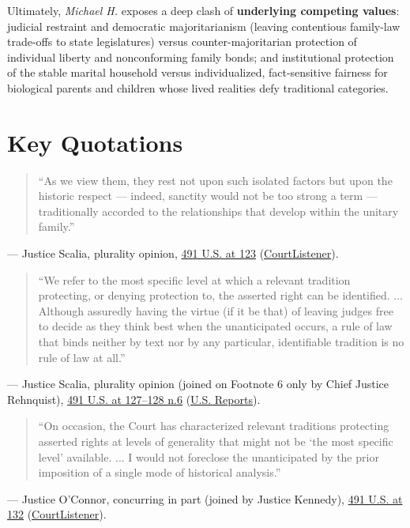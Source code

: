 \documentclass[12pt]{article}
\begin{document}
Ultimately, \textit{Michael H.} exposes a deep clash of \textbf{underlying competing values}: judicial restraint and democratic majoritarianism (leaving contentious family-law trade-offs to state legislatures) versus counter-majoritarian protection of individual liberty and nonconforming family bonds; and institutional protection of the stable marital household versus individualized, fact-sensitive fairness for biological parents and children whose lived realities defy traditional categories.

\section{Key Quotations}

\begin{quote}
``As we view them, they rest not upon such isolated factors but upon the historic respect --- indeed, sanctity would not be too strong a term --- traditionally accorded to the relationships that develop within the unitary family.''
\end{quote}
\noindent --- Justice Scalia, plurality opinion, \href{https://supreme.justia.com/cases/federal/us/491/110/}{491 U.S. at 123} (\href{https://www.courtlistener.com/opinion/112295/michael-h-v-gerald-d/}{CourtListener}).

\begin{quote}
``We refer to the most specific level at which a relevant tradition protecting, or denying protection to, the asserted right can be identified. ... Although assuredly having the virtue (if it be that) of leaving judges free to decide as they think best when the unanticipated occurs, a rule of law that binds neither by text nor by any particular, identifiable tradition is no rule of law at all.''
\end{quote}
\noindent --- Justice Scalia, plurality opinion (joined on Footnote 6 only by Chief Justice Rehnquist), \href{https://supreme.justia.com/cases/federal/us/491/110/}{491 U.S. at 127--128 n.6} (\href{https://tile.loc.gov/storage-services/service/ll/usrep/usrep491/usrep491110/usrep491110.pdf}{U.S. Reports}).

\begin{quote}
``On occasion, the Court has characterized relevant traditions protecting asserted rights at levels of generality that might not be `the most specific level' available. ... I would not foreclose the unanticipated by the prior imposition of a single mode of historical analysis.''
\end{quote}
\noindent --- Justice O'Connor, concurring in part (joined by Justice Kennedy), \href{https://supreme.justia.com/cases/federal/us/491/110/}{491 U.S. at 132} (\href{https://www.courtlistener.com/opinion/112295/michael-h-v-gerald-d/}{CourtListener}).
\end{document}
